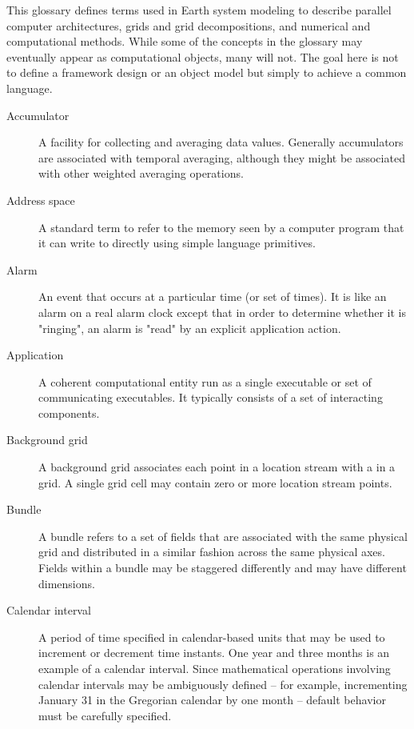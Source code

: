
This glossary defines terms used in Earth system modeling to describe 
parallel computer architectures, grids and grid decompositions, and 
numerical and computational methods.  While some of the concepts in 
the glossary may eventually appear as computational objects, many 
will not.  The goal here is not to define a framework design or an 
object model but simply to achieve a common language.

\begin{description}

\item[Accumulator] \label{glos:Accumulator} A facility for collecting and 
  averaging data values.  Generally accumulators are associated with 
  temporal averaging, although they might be associated with 
  other weighted averaging operations.    
  
\item[Address space] \label{glos:ASP}A standard term to refer to the memory
  seen by a computer program that it can write to directly using
  simple language primitives. 

\item[Alarm] \label{glos:Alarm} An event 
  that occurs at a particular time (or set of times).  It is like an
   alarm on a real alarm clock except that in order to determine whether 
it is "ringing", an alarm is "read" by an explicit application action.

\item[Application] \label{glos:Application} A coherent computational 
  entity run 
  as a single executable or set of communicating executables.  It 
  typically consists of a set of interacting components.

\item[Background grid] \label{glos:BackGrid} 
  A background grid associates each point in a location stream with a 
  in a grid. A single grid cell may contain zero or more location 
  stream points.  

\item[Bundle] \label{glos:Bundle} A bundle refers to a set of fields that 
  are associated with the same physical grid and distributed in a similar 
  fashion across the same physical axes.  Fields within a bundle may be
  staggered differently and may have different dimensions.

\item[Calendar interval] \label{glos:CalInt} A period of time specified
in calendar-based units that may be used to increment or decrement time instants.  
One year and three months is an example of a calendar interval.  Since 
mathematical operations involving calendar intervals may be ambiguously 
defined -- for example, incrementing January 31 in the Gregorian calendar by 
one month -- default behavior must be carefully specified.  


\end{description}
